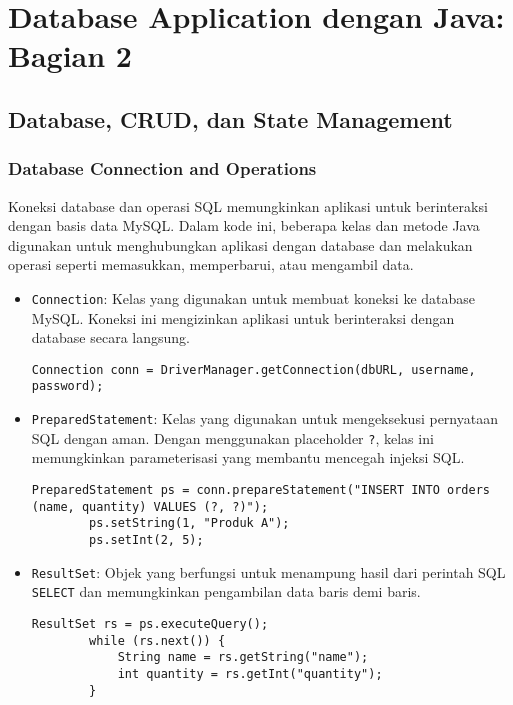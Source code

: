 \chapter{Database Application dengan Java: Bagian 2}

\section{Database, CRUD, dan State Management}

\subsection{Database Connection and Operations}

Koneksi database dan operasi SQL memungkinkan aplikasi untuk berinteraksi dengan basis data MySQL. Dalam kode ini, beberapa kelas dan metode Java digunakan untuk menghubungkan aplikasi dengan database dan melakukan operasi seperti memasukkan, memperbarui, atau mengambil data.

\begin{itemize}
	\item \texttt{Connection}: Kelas yang digunakan untuk membuat koneksi ke database MySQL. Koneksi ini mengizinkan aplikasi untuk berinteraksi dengan database secara langsung.
	\begin{lstlisting}[style=JavaStyle]
		Connection conn = DriverManager.getConnection(dbURL, username, password);
	\end{lstlisting}
	
	\item \texttt{PreparedStatement}: Kelas yang digunakan untuk mengeksekusi pernyataan SQL dengan aman. Dengan menggunakan placeholder \texttt{?}, kelas ini memungkinkan parameterisasi yang membantu mencegah injeksi SQL.
	\begin{lstlisting}[style=JavaStyle]
		PreparedStatement ps = conn.prepareStatement("INSERT INTO orders (name, quantity) VALUES (?, ?)");
		ps.setString(1, "Produk A");
		ps.setInt(2, 5);
	\end{lstlisting}
	
	\item \texttt{ResultSet}: Objek yang berfungsi untuk menampung hasil dari perintah SQL \texttt{SELECT} dan memungkinkan pengambilan data baris demi baris.
	\begin{lstlisting}[style=JavaStyle]
		ResultSet rs = ps.executeQuery();
		while (rs.next()) {
			String name = rs.getString("name");
			int quantity = rs.getInt("quantity");
		}
	\end{lstlisting}
\end{itemize}

